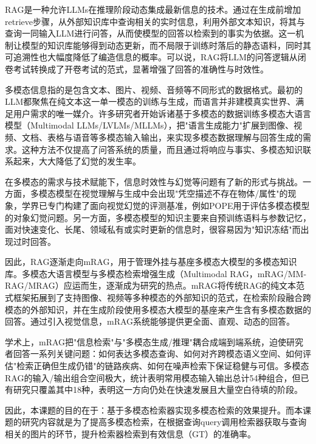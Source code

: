 \documentclass[12pt,a4paper]{article}
\begin{document}
RAG是一种允许LLMs在推理阶段动态集成最新信息的技术\cite{lewis2020rag,gao2023rag}。通过在生成前增加retrieve步骤，从外部知识库中查询相关的实时信息，利用外部文本知识，将其与查询一同输入LLM进行问答，从而使模型的回答以检索到的事实为依据\cite{gao2023rag}。这一机制让模型的知识库能够得到动态更新，而不局限于训练时落后的静态语料，同时其可追溯性也大幅度降低了编造信息的概率。可以说，RAG将LLM的问答逻辑从闭卷考试转换成了开卷考试的范式，显著增强了回答的准确性与时效性。

多模态信息指的是包含文本、图片、视频、音频等不同形式的数据格式。最初的LLM都聚焦在纯文本这一单一模态的训练与生成，而语言并非建模真实世界、满足用户需求的唯一媒介。许多研究者开始诉诸基于多模态的数据训练多模态大语言模型（Multimodal LLMs/LVLMs/MLLMs），把"语言生成能力"扩展到图像、视频、文档、表格与语音等多模态输入输出，来实现多模态数据理解与回答生成的需求\cite{mei2025multimodalrag,abootorabi2025ask}。这种方法不仅提高了问答系统的质量，而且通过将响应与事实、多模态知识联系起来，大大降低了幻觉的发生率。

在多模态的需求与技术赋能下，信息时效性与幻觉等问题有了新的形式与挑战。一方面，多模态模型在视觉理解与生成中会出现"凭空描述不存在物体/属性"的现象，学界已专门构建了面向视觉幻觉的评测基准，例如POPE用于评估多模态模型的对象幻觉问题\cite{li2023pope}。另一方面，多模态模型的知识主要来自预训练语料与参数记忆，面对快速变化、长尾、领域私有或实时更新的信息时，很容易因为"知识冻结"而出现过时回答\cite{gao2023rag}。

因此，RAG逐渐走向mRAG，用于管理外挂与基座多模态大模型的多模态知识库。多模态大语言模型与多模态检索增强生成（Multimodal RAG，mRAG/MM-RAG/MRAG）应运而生，逐渐成为研究的热点\cite{mei2025multimodalrag,abootorabi2025ask}。mRAG将传统RAG的纯文本范式框架拓展到了支持图像、视频等多种模态的外部知识的范式，在检索阶段融合跨模态的外部知识，并在生成阶段使用多模态大模型的基座来产生含有多模态数据的回答\cite{abootorabi2025ask}。通过引入视觉信息，mRAG系统能够提供更全面、直观、动态的回答。

学术上，mRAG把"信息检索"与"多模态生成/推理"耦合成端到端系统，迫使研究者回答一系列关键问题：如何表达多模态查询、如何对齐跨模态语义空间、如何评估"检索正确但生成仍错"的链路疾病、如何在噪声检索下保证稳健与可信\cite{abootorabi2025ask}。多模态RAG的输入/输出组合空间极大，统计表明常用模态输入输出总计54种组合，但已有研究只覆盖其中18种，表明这一方向仍处在快速发展且大量空白待填的阶段\cite{abootorabi2025ask}。

因此，本课题的目的在于：基于多模态检索器实现多模态检索的效果提升。而本课题的研究内容就是为了提高多模态检索，在根据查询query调用检索器获取与查询相关的图片的环节，提升检索器检索到有效信息（GT）的准确率。
\end{document}
